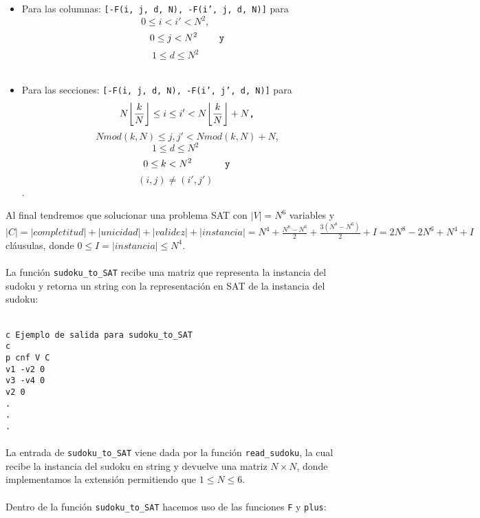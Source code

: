 \documentclass[letterpaper,12pt]{article}
\DeclarePairedDelimiter\floor{\lfloor}{\rfloor}
\begin{document}
\begin{itemize}
\begin{itemize}
		\item Para las columnas:
\texttt{[-F(i, j, d, N),  -F(i', j, d, N)]} para 
$$0 \leq i < i'< N^2,\hspace{1cm}$$ 
$$0 \leq j < N^2 \hspace{0.8cm} \texttt{y}$$
$$1 \leq d \leq N^2\hspace{1cm}$$\\
		
		\item Para las secciones:
\texttt{[-F(i, j, d, N),  -F(i', j', d, N)]} para 
\begin{equation*}
   N \floor*{\frac{k}{N}} \leq i \leq i' < N \floor*{\frac{k}{N}} + N \texttt{,}
\end{equation*}
\begin{equation*}
   N mod(k,N) \leq j, j' < N mod(k,N) + N \texttt{,}
\end{equation*}
$$1 \leq d \leq N^2 \hspace{1cm}$$
$$0 \leq k < N^2 \hspace{1.2cm} \texttt{y}$$
$$(i,j) \neq (i',j') \hspace{1cm}$$.\\
	\end{itemize}

\end{itemize}

Al final tendremos que solucionar una problema SAT con $|V|= N^6$ variables \hspace{0.2cm} y \hspace{0.2cm} $|C|= |completitud| + |unicidad| + |validez| + |instancia| = N^4 + \frac{N^8 - N^6}{2} + \frac{3(N^8-N^6)}{2} + I = 2N^8 - 2N^6 + N^4 + I$ cl\'ausulas, donde $ 0 \leq I = |instancia| \leq N^4$.\\ \\

La función \texttt{sudoku\_to\_SAT} recibe una matriz que representa la instancia del sudoku y retorna un string con la representación en SAT de la instancia del sudoku:

\texttt{\\
c Ejemplo de salida para sudoku\_to\_SAT\\
c \\
p cnf V C \\
v1 -v2 0\\
v3 -v4 0\\
v2 0\\
.\\
.\\
.\\}\\
La entrada de \texttt{sudoku\_to\_SAT} viene dada por la función \texttt{read\_sudoku}, la cual recibe la instancia del sudoku en string y devuelve una matriz $N \times N$, donde implementamos la extensión permitiendo que $1 \leq N \leq 6$.\\
\\
Dentro de la función \texttt{sudoku\_to\_SAT} hacemos uso de las funciones \texttt{F} y \texttt{plus}:\\
\end{document}
